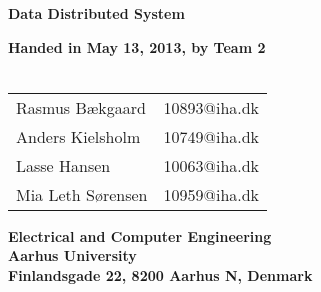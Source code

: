 \documentclass[a4paper,10pt]{report}
\begin{document}
\begin{titlepage}
\begin{center}
{\LARGE \textbf{Data Distributed System}}


\vspace{4cm}
\textbf{Handed in May 13, 2013, by Team 2}\\~\\
\begin{tabular}{ll}
Rasmus Bækgaard  & 10893@iha.dk \\
Anders Kielsholm  & 10749@iha.dk \\
Lasse Hansen  & 10063@iha.dk \\
Mia Leth Sørensen & 10959@iha.dk \\
\end{tabular}
\vfill
\textbf{Electrical and Computer Engineering}\\
\textbf{Aarhus University}\\
\textbf{Finlandsgade 22, 8200 Aarhus N, Denmark}
\end{center}
\end{titlepage}














\end{document}
